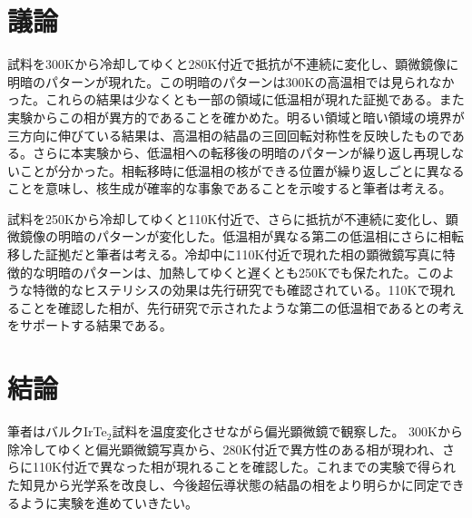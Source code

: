 \documentclass[11pt,a4paper]{jsarticle}
\begin{document}
\section{議論}
試料を300Kから冷却してゆくと280K付近で抵抗が不連続に変化し、顕微鏡像に明暗のパターンが現れた。この明暗のパターンは300Kの高温相では見られなかった。これらの結果は少なくとも一部の領域に低温相が現れた証拠である。また実験からこの相が異方的であることを確かめた。明るい領域と暗い領域の境界が三方向に伸びている結果は、高温相の結晶の三回回転対称性を反映したものである。さらに本実験から、低温相への転移後の明暗のパターンが繰り返し再現しないことが分かった。相転移時に低温相の核ができる位置が繰り返しごとに異なることを意味し、核生成が確率的な事象であることを示唆すると筆者は考える。

試料を250Kから冷却してゆくと110K付近で、さらに抵抗が不連続に変化し、顕微鏡像の明暗のパターンが変化した。低温相が異なる第二の低温相にさらに相転移した証拠だと筆者は考える。冷却中に110K付近で現れた相の顕微鏡写真に特徴的な明暗のパターンは、加熱してゆくと遅くとも250Kでも保たれた。このような特徴的なヒステリシスの効果は先行研究\cite{IrTe_TT3,IrTe_TT4}でも確認されている。110Kで現れることを確認した相が、先行研究で示されたような第二の低温相であるとの考えをサポートする結果である。
 
 \section{結論}
筆者はバルクIrTe$_2$試料を温度変化させながら偏光顕微鏡で観察した。
300Kから除冷してゆくと偏光顕微鏡写真から、280K付近で異方性のある相が現われ、さらに110K付近で異なった相が現れることを確認した。これまでの実験で得られた知見から光学系を改良し、今後超伝導状態の結晶の相をより明らかに同定できるように実験を進めていきたい。



\end{document}
